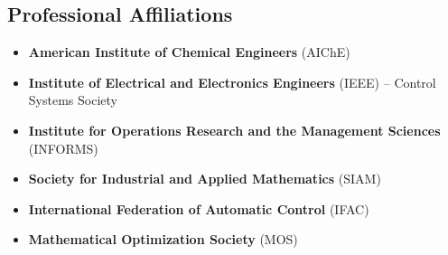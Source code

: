 \subsection*{Professional Affiliations}
\begin{itemize}[label=$\bullet$,itemsep=0pt]
\item \textbf{American Institute of Chemical Engineers} (AIChE)
\item \textbf{Institute of Electrical and Electronics Engineers} (IEEE) -- Control Systems Society
\item \textbf{Institute for Operations Research and the Management Sciences} (INFORMS)
\item \textbf{Society for Industrial and Applied Mathematics} (SIAM)
\item \textbf{International Federation of Automatic Control} (IFAC)
\item \textbf{Mathematical Optimization Society} (MOS)
\end{itemize}
\let\OLDthebibliography\thebibliography
\renewcommand\thebibliography[1]{
  \OLDthebibliography{#1}
  \setlength{\parskip}{0pt}
  \setlength{\itemsep}{0pt}
}
